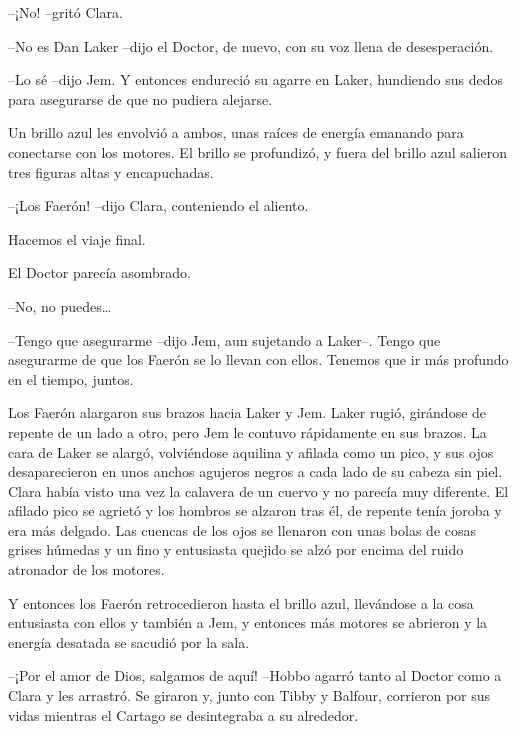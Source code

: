 {--¡No! --gritó Clara.}

{--No es Dan Laker --dijo el Doctor, de nuevo, con su voz llena de
desesperación.}

{--Lo sé --dijo Jem. Y entonces endureció su agarre en Laker, hundiendo
sus dedos para asegurarse de que no pudiera alejarse.}

{Un brillo azul les envolvió a ambos, unas raíces de energía emanando
 para conectarse con los motores. El brillo se profundizó, y fuera del
brillo azul salieron tres figuras altas y encapuchadas.}

{--¡Los Faerón! --dijo Clara, conteniendo el aliento.}

{Hacemos el viaje final.}

{El Doctor parecía asombrado.}

{--No, no puedes\ldots{}}

{--Tengo que asegurarme --dijo Jem, aun sujetando a Laker--. Tengo que
 asegurarme de que los Faerón se lo llevan con ellos. Tenemos que ir más
profundo en el tiempo, juntos.}

{Los Faerón alargaron sus brazos hacia Laker y Jem. Laker rugió,
 girándose de repente de un lado a otro, pero Jem le contuvo rápidamente
 en sus brazos. La cara de Laker se alargó, volviéndose aquilina y
 afilada como un pico, y sus ojos desaparecieron en unos anchos agujeros
 negros a cada lado de su cabeza sin piel. Clara había visto una vez la
 calavera de un cuervo y no parecía muy diferente. El afilado pico se
 agrietó y los hombros se alzaron tras él, de repente tenía joroba y era
 más delgado. Las cuencas de los ojos se llenaron con unas bolas de cosas
 grises húmedas y un fino y entusiasta quejido se alzó por encima del
ruido atronador de los motores.}

{Y entonces los Faerón retrocedieron hasta el brillo azul, llevándose a
 la cosa entusiasta con ellos y también a Jem, y entonces más motores se
abrieron y la energía desatada se sacudió por la sala.}

{--¡Por el amor de Dios, salgamos de aquí! --Hobbo agarró tanto al Doctor
 como a Clara y les arrastró. Se giraron y, junto con Tibby y Balfour,
 corrieron por sus vidas mientras el Cartago se desintegraba a su
alrededor.}
